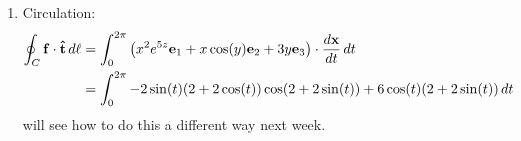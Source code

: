 \documentclass[10pt, a4paper]{article}
\begin{document}
\begin{problem}
\begin{solution}
\begin{enumerate}[label = (\alph*)]
            Parametrise $S$ with polar coordinates in $(y, z)$ plane with centre at $(2, 2)$:
            \[
            \vec{x}(u, v) = (2 + u\cos(v))\vec{e}_2 + (2 + u\sin(v))\vec{e}_3\qquad\text{for } u \in [0, 2], v \in [0, 2\pi].
            \]
            Want to calculate
            \begin{align*}
                \int_{S}(\bnabla \times \vec{f})\cdot\hvec{n}\,dS &= \int_{0}^{2\pi}\int_{0}^{2}(\bnabla \times \vec{f}) \cdot \hvec{n}\left|\pd[\vec{x}]{u} \times \pd[\vec{x}]{v}\right|\,dudv \\
                &= \int_{0}^{2\pi}\int_{0}^{2}(\bnabla \times \vec{f}) \cdot \left(\pd[\vec{x}]{u} \times \pd[\vec{x}]{v}\right)\,dudv \\
                \pd[\vec{x}]{u} \times \pd[\vec{x}]{v} &= \begin{vmatrix}
                    \vec{e}_1 & \vec{e}_2 & \vec{e}_3 \\
                    0 & \cos{v} & \sin{v} \\
                    0 & -u\sin{v} & u\cos{v}
                \end{vmatrix} \\
                &= \vec{e}_1(u\cos ^ 2v + u\sin ^ 2v) = u\vec{e}_1 \\
                \int_{0}^{2\pi}\int_{0}^{2}(\bnabla \times \vec{f}) \cdot \left(\pd[\vec{x}]{u} \times \pd[\vec{x}]{v}\right)\,dudv &= \int_{0}^{2\pi}\int_{0}^{2}(3\vec{e}_1 + 5x ^ 2e ^ {5z}\vec{e}_2 + \cos(y)\vec{e}_3) \cdot (u\vec{e}_1)\,dudv \\
                &= \int_{0}^{2\pi}\int_{0}^{2}3u\,dudv \\
                &= \int_{0}^{2\pi}\left[\frac{3u ^ 2}{2}\right]_{0}^{2}\,dv \\
                &= 6\int_{0}^{2\pi}\,dv = 12\pi.
            \end{align*}

            \item
            Circulation:
            \begin{align*}
                \oint_{C}\mathbf{f}\cdot\mathbf{\hat{t}}\,d\ell &= \int_{0}^{2\pi}\left(x ^ 2e ^ {5z}\mathbf{e}_1 + x\cos(y)\mathbf{e}_2 + 3y\mathbf{e}_3\right)\cdot\frac{d\mathbf{x}}{dt}\,dt \\
                &= \int_{0}^{2\pi}-2\sin(t)(2 + 2\cos(t))\cos(2 + 2\sin(t)) + 6\cos(t)(2 + 2\sin(t))\,dt
            \end{align*}
            will see how to do this a different way next week.
        \end{enumerate}
    \end{solution}
\end{problem}
\end{document}
